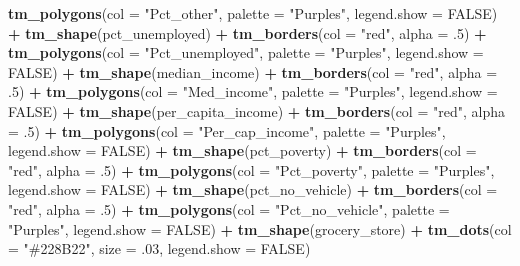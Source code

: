 \documentclass[
]{article}
\newenvironment{Shaded}{\begin{snugshade}}{\end{snugshade}}
\newcommand{\AttributeTok}[1]{\textcolor[rgb]{0.13,0.29,0.53}{#1}}
\newcommand{\ConstantTok}[1]{\textcolor[rgb]{0.56,0.35,0.01}{#1}}
\newcommand{\DecValTok}[1]{\textcolor[rgb]{0.00,0.00,0.81}{#1}}
\newcommand{\FunctionTok}[1]{\textcolor[rgb]{0.13,0.29,0.53}{\textbf{#1}}}
\newcommand{\NormalTok}[1]{#1}
\newcommand{\SpecialCharTok}[1]{\textcolor[rgb]{0.81,0.36,0.00}{\textbf{#1}}}
\newcommand{\StringTok}[1]{\textcolor[rgb]{0.31,0.60,0.02}{#1}}
\begin{document}
\begin{Shaded}
\begin{Highlighting}[]
  \FunctionTok{tm\_polygons}\NormalTok{(}\AttributeTok{col =} \StringTok{"Pct\_other"}\NormalTok{,}
              \AttributeTok{palette =} \StringTok{"Purples"}\NormalTok{,}
              \AttributeTok{legend.show =} \ConstantTok{FALSE}\NormalTok{) }\SpecialCharTok{+}
  \FunctionTok{tm\_shape}\NormalTok{(pct\_unemployed) }\SpecialCharTok{+}
  \FunctionTok{tm\_borders}\NormalTok{(}\AttributeTok{col =} \StringTok{"red"}\NormalTok{, }\AttributeTok{alpha =}\NormalTok{ .}\DecValTok{5}\NormalTok{) }\SpecialCharTok{+}
  \FunctionTok{tm\_polygons}\NormalTok{(}\AttributeTok{col =} \StringTok{"Pct\_unemployed"}\NormalTok{,}
              \AttributeTok{palette =} \StringTok{"Purples"}\NormalTok{,}
              \AttributeTok{legend.show =} \ConstantTok{FALSE}\NormalTok{) }\SpecialCharTok{+}
    \FunctionTok{tm\_shape}\NormalTok{(median\_income) }\SpecialCharTok{+}
  \FunctionTok{tm\_borders}\NormalTok{(}\AttributeTok{col =} \StringTok{"red"}\NormalTok{, }\AttributeTok{alpha =}\NormalTok{ .}\DecValTok{5}\NormalTok{) }\SpecialCharTok{+}
  \FunctionTok{tm\_polygons}\NormalTok{(}\AttributeTok{col =} \StringTok{"Med\_income"}\NormalTok{,}
              \AttributeTok{palette =} \StringTok{"Purples"}\NormalTok{,}
              \AttributeTok{legend.show =} \ConstantTok{FALSE}\NormalTok{) }\SpecialCharTok{+}
  \FunctionTok{tm\_shape}\NormalTok{(per\_capita\_income) }\SpecialCharTok{+}
  \FunctionTok{tm\_borders}\NormalTok{(}\AttributeTok{col =} \StringTok{"red"}\NormalTok{, }\AttributeTok{alpha =}\NormalTok{ .}\DecValTok{5}\NormalTok{) }\SpecialCharTok{+}
  \FunctionTok{tm\_polygons}\NormalTok{(}\AttributeTok{col =} \StringTok{"Per\_cap\_income"}\NormalTok{,}
              \AttributeTok{palette =} \StringTok{"Purples"}\NormalTok{,}
              \AttributeTok{legend.show =} \ConstantTok{FALSE}\NormalTok{) }\SpecialCharTok{+}
  \FunctionTok{tm\_shape}\NormalTok{(pct\_poverty) }\SpecialCharTok{+}
  \FunctionTok{tm\_borders}\NormalTok{(}\AttributeTok{col =} \StringTok{"red"}\NormalTok{, }\AttributeTok{alpha =}\NormalTok{ .}\DecValTok{5}\NormalTok{) }\SpecialCharTok{+}
  \FunctionTok{tm\_polygons}\NormalTok{(}\AttributeTok{col =} \StringTok{"Pct\_poverty"}\NormalTok{,}
              \AttributeTok{palette =} \StringTok{"Purples"}\NormalTok{,}
              \AttributeTok{legend.show =} \ConstantTok{FALSE}\NormalTok{) }\SpecialCharTok{+}
    \FunctionTok{tm\_shape}\NormalTok{(pct\_no\_vehicle) }\SpecialCharTok{+}
  \FunctionTok{tm\_borders}\NormalTok{(}\AttributeTok{col =} \StringTok{"red"}\NormalTok{, }\AttributeTok{alpha =}\NormalTok{ .}\DecValTok{5}\NormalTok{) }\SpecialCharTok{+}
  \FunctionTok{tm\_polygons}\NormalTok{(}\AttributeTok{col =} \StringTok{"Pct\_no\_vehicle"}\NormalTok{,}
              \AttributeTok{palette =} \StringTok{"Purples"}\NormalTok{,}
              \AttributeTok{legend.show =} \ConstantTok{FALSE}\NormalTok{) }\SpecialCharTok{+}
  \FunctionTok{tm\_shape}\NormalTok{(grocery\_store) }\SpecialCharTok{+}
  \FunctionTok{tm\_dots}\NormalTok{(}\AttributeTok{col =} \StringTok{"\#228B22"}\NormalTok{,}
          \AttributeTok{size =}\NormalTok{ .}\DecValTok{03}\NormalTok{,}
          \AttributeTok{legend.show =} \ConstantTok{FALSE}\NormalTok{)}
\end{Highlighting}
\end{Shaded}
\end{document}
